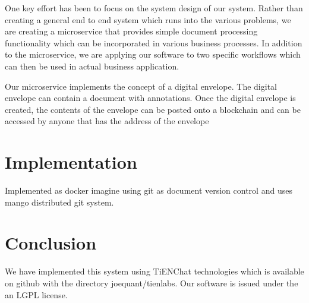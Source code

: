 \documentclass[journal]{IEEEtran}
\begin{document}
One key effort has been to focus on the system design of our system.
Rather than creating a general end to end system which runs into the
various problems, we are creating a microservice that provides simple
document processing functionality which can be incorporated in various
business processes.  In addition to the microservice, we are applying
our software to two specific workflows which can then be used in
actual business application.

Our microservice implements the concept of a digital envelope.  The
digital envelope can contain a document with annotations.  Once the
digital envelope is created, the contents of the envelope can be
posted onto a blockchain and can be accessed by anyone that has the
address of the envelope 

\section{Implementation}

Implemented as docker imagine using git as document version control
and uses mango distributed git system.  

\section{Conclusion}
We have implemented this system using TiENChat technologies which is
available on github with the directory joequant/tienlabs.  Our
software is issued under the an LGPL license.



\end{document}
